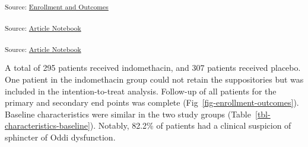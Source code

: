 \documentclass[
  10pt,
  letterpaper,
]{article}
\begin{document}
\textsubscript{Source:
\href{https://mine-cetinkaya-rundel.github.io/indo-rct/notebooks/consort-preview.html\#cell-fig-enrollment-outcomes}{Enrollment
and Outcomes}}

\textsubscript{Source:
\href{https://mine-cetinkaya-rundel.github.io/indo-rct/index.qmd.html}{Article
Notebook}}

\textsubscript{Source:
\href{https://mine-cetinkaya-rundel.github.io/indo-rct/index.qmd.html}{Article
Notebook}}

A total of 295 patients received indomethacin, and 307 patients received
placebo. One patient in the indomethacin group could not retain the
suppositories but was included in the intention-to-treat analysis.
Follow-up of all patients for the primary and secondary end points was
complete (Fig~\ref{fig-enrollment-outcomes}). Baseline characteristics
were similar in the two study groups
(Table~\ref{tbl-characteristics-baseline}). Notably, 82.2\% of patients
had a clinical suspicion of sphincter of Oddi dysfunction.
\end{document}
